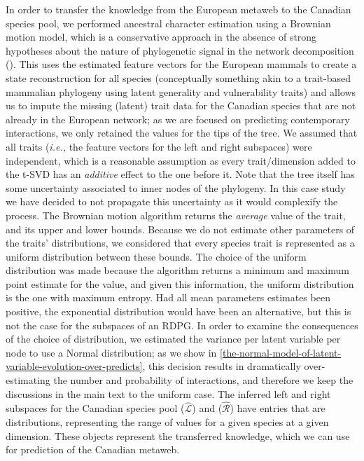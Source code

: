 \begin{refsection}
In order to transfer the knowledge from the European metaweb to the
Canadian species pool, we performed ancestral character estimation using
a Brownian motion model, which is a conservative approach in the absence
of strong hypotheses about the nature of phylogenetic signal in the
network decomposition (\cite{Litsios2012Effects}). This uses the estimated
feature vectors for the European mammals to create a state
reconstruction for all species (conceptually something akin to a
trait-based mammalian phylogeny using latent generality and
vulnerability traits) and allows us to impute the missing (latent) trait
data for the Canadian species that are not already in the European
network; as we are focused on predicting contemporary interactions, we
only retained the values for the tips of the tree. We assumed that all
traits (\emph{i.e.,} the feature vectors for the left and right
subspaces) were independent, which is a reasonable assumption as every
trait/dimension added to the t-SVD has an \emph{additive} effect to the
one before it. Note that the \cite{Upham2019Inferring} tree itself has some
uncertainty associated to inner nodes of the phylogeny. In this case
study we have decided to not propagate this uncertainty as it would
complexify the process. The Brownian motion algorithm returns the
\emph{average} value of the trait, and its upper and lower bounds.
Because we do not estimate other parameters of the traits'
distributions, we considered that every species trait is represented as
a uniform distribution between these bounds. The choice of the uniform
distribution was made because the algorithm returns a minimum and
maximum point estimate for the value, and given this information, the
uniform distribution is the one with maximum entropy. Had all mean
parameters estimates been positive, the exponential distribution would
have been an alternative, but this is not the case for the subspaces of
an RDPG. In order to examine the consequences of the choice of
distribution, we estimated the variance per latent variable per node to
use a Normal distribution; as we show in \autoref{the-normal-model-of-latent-variable-evolution-over-predicts}, this decision
results in dramatically over-estimating the number and probability of
interactions, and therefore we keep the discussions in the main text to
the uniform case. The inferred left and right subspaces for the Canadian
species pool ($\hat{\mathscr{L}}$) and ($\hat{\mathscr{R}}$) have
entries that are distributions, representing the range of values for a
given species at a given dimension. These objects represent the
transferred knowledge, which we can use for prediction of the Canadian
metaweb.


\end{refsection}
